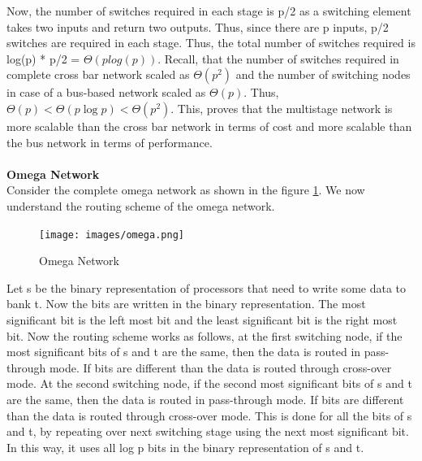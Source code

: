 \documentclass[12pt]{book}
\begin{document}
Now, the number of switches required in each stage is p/2 as a switching element takes two inputs and return two outputs. Thus, 
since there are p inputs, p/2 switches are required in each stage. Thus, the total number of switches required is log(p) * p/2 = $\Theta(plog(p))$.
Recall, that the number of switches required in complete cross bar network scaled as $\Theta(p^2)$ and the number of switching nodes in case of a bus-based network
scaled as $\Theta(p)$. Thus, $\Theta(p)<\Theta(p \log p)<\Theta(p^2)$. This, proves that the 
multistage network is more scalable than the cross bar network in terms of cost and more scalable than the bus network in terms of performance. \\
\\
\textbf{Omega Network}\\
Consider the complete omega network as shown in the figure \ref{fig:omega}.
We now understand the routing scheme of the omega network.
\begin{figure}[H]
    \centering
    \texttt{[image: images/omega.png]}
    \caption{Omega Network}
    \label{fig:omega}
\end{figure}
Let s be the binary representation of processors that need to write some data to bank t.
Now the bits are written in the binary representation. The most significant bit is the left most bit and the least 
significant bit is the right most bit. Now the routing scheme works as follows, at the first switching node, if the most
significant bits of s and t are the same, then the data is routed in pass-through mode. If bits are different than the data is routed through
cross-over mode. At the second switching node, if the second most significant bits of s and t are the same, then the data is routed in pass-through mode.
If bits are different than the data is routed through cross-over mode. This is done for all the bits of s and t, by repeating over 
next switching stage using the next most significant bit. In this way, it uses all log p bits in the binary representation of s and t.
\end{document}
